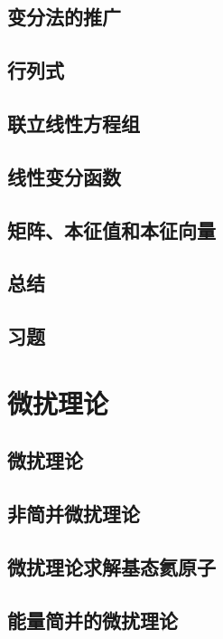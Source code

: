 \documentclass{book}
\begin{document}
	\section{变分法的推广}
	
	\section{行列式}

	\section{联立线性方程组}
	
	\section{线性变分函数}
	
	\section{矩阵、本征值和本征向量}
	
	\section*{总结}
	
	\section*{习题}
	
	\chapter{微扰理论}
	\section{微扰理论}
	
	\section{非简并微扰理论}
	
	\section{微扰理论求解基态氦原子}
	
	\section{能量简并的微扰理论}
	
\end{document}
